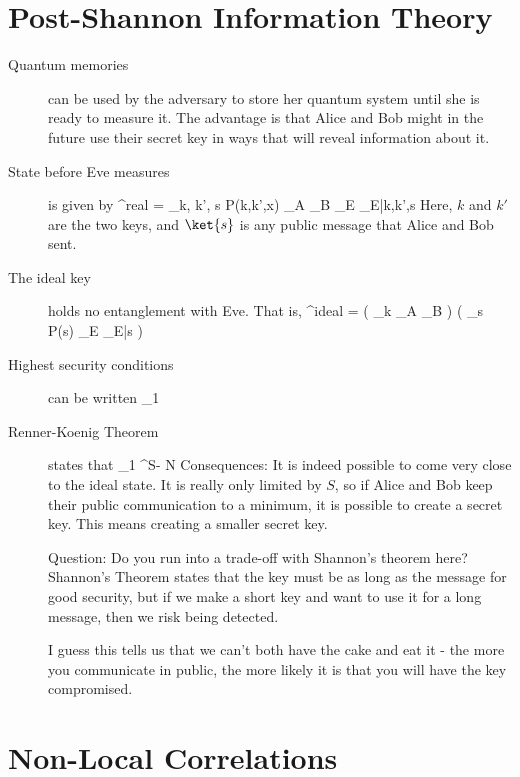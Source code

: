 \section{Post-Shannon Information Theory}
\begin{description}
\item[Quantum memories] can be used by the adversary to store her quantum system until she is ready to measure it. The advantage is that Alice and Bob might in the future use their secret key in ways that will reveal information about it. 

\item[State before Eve measures] is given by
\beq
\rho^{real} = \sum_{k, k', s} P(k,k',x) _A \otimes {}_B \otimes {}_E \otimes \rho_{E|k,k',s}
\eeq
Here, $k$ and $k'$ are the two keys, and $\ket{s}$ is any public message that Alice and Bob sent. 

\item[The ideal key] holds no entanglement with Eve. That is, 
\beq
\rho^{ideal} = \left( \sum_k  _A \otimes {}_B \right) \otimes \left( \sum_s P(s) _E \otimes \rho_{E|s} \right)
\eeq

\item[Highest security conditions] can be written 
\beq
{}_1 \leq \epsilon
\eeq

\item[Renner-Koenig Theorem] states that 
\beq
{}_1 \leq {}^{S- N\left[ I (X:Y) - I(X:E) \right]}
\eeq
Consequences: It is indeed possible to come very close to the ideal state. It is really only limited by $S$, so if Alice and Bob keep their public communication to a minimum, it is possible to create a secret key. This means creating a smaller secret key. 

Question: Do you run into a trade-off with Shannon's theorem here? Shannon's Theorem states that the key must be as long as the message for good security, but if we make a short key and want to use it for a long message, then we risk being detected. 

I guess this tells us that we can't both have the cake and eat it - the more you communicate in public, the more likely it is that you will have the key compromised. 

\end{description}
\section{Non-Local Correlations}
